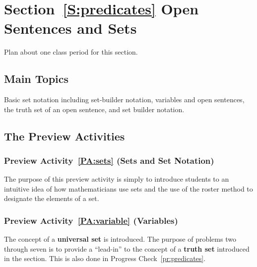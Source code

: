 \section*{Section~\ref{S:predicates} Open Sentences and Sets}
Plan about one class period for this section.

\subsection*{Main Topics}
Basic set notation including set-builder notation, variables and open sentences, the truth set of an open sentence, and set builder notation.

\subsection*{The Preview Activities}
\subsubsection*{Preview Activity~\ref{PA:sets} (Sets and Set Notation)} 
The purpose of this preview activity is simply to introduce students to an intuitive idea of how mathematicians use sets and the use of the roster method to designate the elements of a set.

\subsubsection*{Preview Activity~\ref{PA:variable} (Variables)}  
The concept of a \textbf{universal set} is introduced.  The purpose of problems two through seven is to provide a ``lead-in'' to the concept of a \textbf{truth set} introduced in the section.  This is also done in Progress Check~\ref{pr:predicates}.
\hbreak


%
